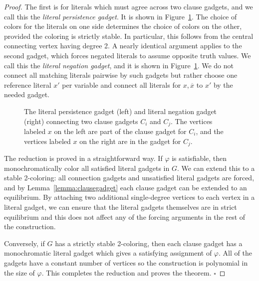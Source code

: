 \documentclass{llncs}
\begin{document}
\begin{proof}
The first is for literals which must agree across two clause gadgets, and we
call this the \emph{literal persistence gadget}. It is shown in
Figure~\ref{fig:connectiongadgets}. The choice of colors for the literals on one
side determines the choice of colors on the other, provided the coloring is
strictly stable. In particular, this follows from the central connecting vertex
having degree 2. A nearly identical argument applies to the second gadget, which
forces negated literals to assume opposite truth values. We call this the
\emph{literal negation gadget}, and it is shown in
Figure~\ref{fig:connectiongadgets}.  We do not connect all matching literals
pairwise by such gadgets but rather choose one reference literal $x'$ per
variable and connect all literals for $x, \overline{x}$ to $x'$ by the needed
gadget.

\begin{figure}[htb]
\centering
{}
\caption{The literal persistence gadget (left) and literal negation gadget
(right) connecting two clause gadgets $C_i$ and $C_j$. The vertices labeled $x$
on the left are part of the clause gadget for $C_i$, and the vertices labeled
$x$ on the right are in the gadget for $C_j$.}
\label{fig:connectiongadgets}
\end{figure}

The reduction is proved in a straightforward way. If $\varphi$ is satisfiable,
then monochromatically color all satisfied literal gadgets in $G$. We can extend
this to a stable 2-coloring: all connection gadgets and unsatisfied literal
gadgets are forced, and by Lemma~\ref{lemma:clausegadget} each clause gadget can
be extended to an equilibrium. By attaching two additional single-degree
vertices to each vertex in a literal gadget, we can ensure that the literal
gadgets themselves are in strict equilibrium and this does not affect any of the
forcing arguments in the rest of the construction.

Conversely, if $G$ has a strictly stable 2-coloring, then each clause gadget has
a monochromatic literal gadget which gives a satisfying assignment of $\varphi$.
All of the gadgets have a constant number of vertices so the construction is
polynomial in the size of $\varphi$. This completes the reduction and proves the
theorem.  \hfill $\square$ 
\end{proof}
\end{document}
